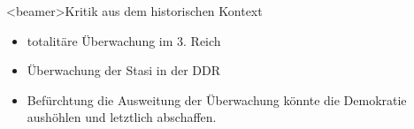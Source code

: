     \begin{frame}<beamer>{Kritik aus dem historischen Kontext}
       \begin{itemize}
        \item totalitäre Überwachung im 3. Reich
        \item Überwachung der Stasi in der DDR
        \item Befürchtung die Ausweitung der Überwachung könnte die Demokratie aushöhlen und letztlich abschaffen.
      \end{itemize}
    \end{frame}

